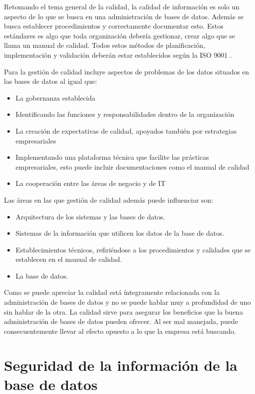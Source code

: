 \documentclass[12pt, article, natbib]{IEEEtran}
\begin{document}
Retomando el tema general de la calidad, la calidad de información es solo un aspecto de lo que se busca en una administración de bases de datos. Además se busca establecer procedimientos y correctamente documentar esto. Estos estándares es algo que toda organización debería gestionar, crear algo que se llama un manual de calidad. Todos estos métodos de planificación, implementación y validación deberán estar establecidos según la ISO 9001 \cite{ISO9001}.

Para la gestión de calidad incluye aspectos de problemas de los datos situados en las bases de datos al igual que:
\begin{itemize}
	\item La gobernanza establecida
	\item Identificando las funciones y responsabilidades dentro de la organización
	\item La creación de expectativas de calidad, apoyados también por estrategias empresariales
	\item Implementando una plataforma técnica que facilite las prácticas empresariales, esto puede incluir documentaciones como el manual de calidad
	\item La cooperación entre las áreas de negocio y de IT
\end{itemize}

Las áreas en las que gestión de calidad además puede influenciar son:
\begin{itemize}
	\item Arquitectura de los sistemas y las bases de datos.
	\item Sistemas de la información que utilicen los datos de la base de datos.
	\item Establecimientos técnicos, refiriéndose a los procedimientos y calidades que se establecen en el manual de calidad.
	\item La base de datos.
\end{itemize}

Como se puede apreciar la calidad está íntegramente relacionada con la administración de bases de datos y no se puede hablar muy a profundidad de uno sin hablar de la otra. La calidad sirve para asegurar los beneficios que la buena administración de bases de datos pueden ofrecer. Al ser mal manejada, puede consecuentemente llevar al efecto opuesto a lo que la empresa está buscando.

\section{Seguridad de la información de la base de datos}
\end{document}
